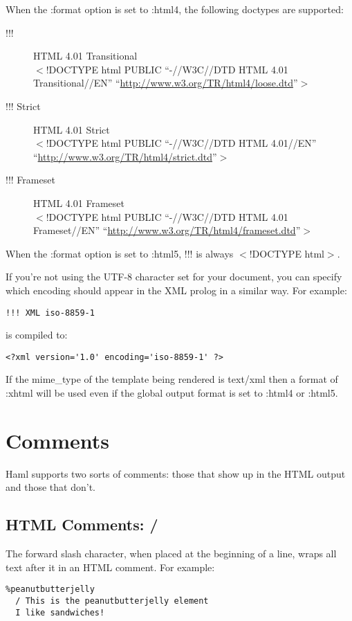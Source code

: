 \documentclass[9pt]{article}
\begin{document}
 When the :format option is set to :html4, the following doctypes are supported:
\begin{description}
\item[!!!]HTML 4.01 Transitional\\ 
$<$!DOCTYPE html PUBLIC ``-//W3C//DTD HTML 4.01 Transitional//EN'' ``\url{http://www.w3.org/TR/html4/loose.dtd}''$>$
\item[!!! Strict]HTML 4.01 Strict\\ 
$<$!DOCTYPE html PUBLIC ``-//W3C//DTD HTML 4.01//EN'' ``\url{http://www.w3.org/TR/html4/strict.dtd}''$>$
\item[!!! Frameset]HTML 4.01 Frameset\\ 
$<$!DOCTYPE html PUBLIC ``-//W3C//DTD HTML 4.01 Frameset//EN'' ``\url{http://www.w3.org/TR/html4/frameset.dtd}''$>$

\end{description}


 When the :format option is set to :html5, !!! is always $<$!DOCTYPE html$>$.


 If you’re not using the UTF-8 character set for your document, you can specify which encoding should appear in the XML prolog in a similar way. For example:
\begin{verbatim}
!!! XML iso-8859-1
\end{verbatim}


 is compiled to:
\begin{verbatim}
<?xml version='1.0' encoding='iso-8859-1' ?>
\end{verbatim}


 If the mime\_type of the template being rendered is text/xml then a format of :xhtml will be used even if the global output format is set to :html4 or :html5.
\section{Comments}


 Haml supports two sorts of comments: those that show up in the HTML output and those that don’t.
\subsection{HTML Comments: /}


 The forward slash character, when placed at the beginning of a line, wraps all text after it in an HTML comment. For example:
\begin{verbatim}
%peanutbutterjelly
  / This is the peanutbutterjelly element
  I like sandwiches!
\end{verbatim}
\end{document}
